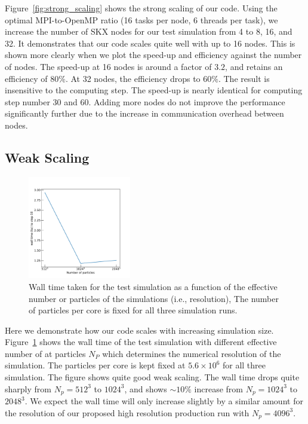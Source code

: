 \documentclass[letterpaper,11pt]{article}
\begin{document}
Figure~\ref{fig:strong_scaling} shows the strong scaling of our code. Using the optimal MPI-to-OpenMP ratio (16 tasks per node, 6 threads per task), we increase the number of SKX nodes for our test simulation from 4 to 8, 16, and 32.
It demonstrates that our code scales quite well with up to 16 nodes. This is shown more clearly when we plot the speed-up and efficiency against the number of nodes. The speed-up at 16 nodes is around a factor of $3.2$, and retains an efficiency of $80\%$. At 32 nodes, the efficiency drops to $60\%$. The result is insensitive to the computing step. The speed-up is nearly identical for computing step number 30 and 60. Adding more nodes do not improve the performance significantly further due to the increase in communication overhead between nodes.  

\subsection{Weak Scaling}

\begin{figure}[htbp]
\centering
\includegraphics[width=0.4\textwidth]{weak_scaling.pdf}

\caption{Wall time taken for the test simulation as a function of the effective number or particles of the simulations (i.e., resolution), The number of particles per core is fixed for all three simulation runs. 
}  
\label{fig:weak_scaling}
\end{figure}

Here we demonstrate how our code scales with increasing simulation size. Figure~\ref{fig:weak_scaling} shows the wall time of the test simulation with different effective number of at particles $N_P$ which determines the numerical resolution of the simulation. The particles per core is kept fixed at $5.6\times 10^6$ for all three simulation. The figure shows quite good weak scaling. The wall time drops quite sharply from $N_p = 512^3$ to $1024^3$, and shows $\sim 10\%$ increase from $N_p = 1024^3$ to $2048^3$. We expect the wall time will only increase slightly by a similar amount for the resolution of our proposed high resolution production run with $N_p = 4096^3$. 
\end{document}
